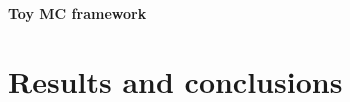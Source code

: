 \begin{refsection}
        \paragraph{Toy MC framework}

\section{Results and conclusions}

\cite{X17:1996} \cite{X17:nuclear:2004} \cite{X17:Krasznahorkay:2015} \cite{X17:Ellwanger:2016} \cite{X17:Feng:2016} \cite{X17_Kozaczuk:2017} \cite{X17:Krasznahorkay:2017} \cite{X17:2019} \cite{X17:2021} 

\printbibliography[title=Bibliography on X17]
\end{refsection}
